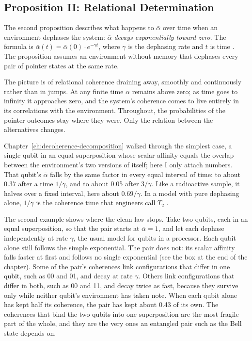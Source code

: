 \subsection*{Proposition II: Relational Determination}

The second proposition describes what happens to $\bar{\alpha}$ over time when an environment dephases the system: \emph{$\bar{\alpha}$ decays exponentially toward zero}. The formula is $\bar{\alpha}(t) = \bar{\alpha}(0) \cdot e^{-\gamma t}$, where $\gamma$ is the dephasing rate and $t$ is time \citep{AdamsRCT}. The proposition assumes an environment without memory that dephases every pair of pointer states at the same rate.

The picture is of relational coherence draining away, smoothly and continuously rather than in jumps. At any finite time $\bar{\alpha}$ remains above zero; as time goes to infinity it approaches zero, and the system's coherence comes to live entirely in its correlations with the environment. Throughout, the probabilities of the pointer outcomes stay where they were. Only the relation between the alternatives changes.

Chapter~\ref{ch:decoherence-decomposition} walked through the simplest case, a single qubit in an equal superposition whose scalar affinity equals the overlap between the environment's two versions of itself; here I only attach numbers. That qubit's $\bar{\alpha}$ falls by the same factor in every equal interval of time: to about 0.37 after a time $1/\gamma$, and to about 0.05 after $3/\gamma$. Like a radioactive sample, it halves over a fixed interval, here about $0.69/\gamma$. In a model with pure dephasing alone, $1/\gamma$ is the coherence time that engineers call $T_2$ \citep{Krantz2019}.

The second example shows where the clean law stops. Take two qubits, each in an equal superposition, so that the pair starts at $\bar{\alpha} = 1$, and let each dephase independently at rate $\gamma$, the usual model for qubits in a processor. Each qubit alone still follows the simple exponential. The pair does not: its scalar affinity falls faster at first and follows no single exponential (see the box at the end of the chapter). Some of the pair's coherences link configurations that differ in one qubit, such as 00 and 01, and decay at rate $\gamma$. Others link configurations that differ in both, such as 00 and 11, and decay twice as fast, because they survive only while neither qubit's environment has taken note. When each qubit alone has kept half its coherence, the pair has kept about 0.43 of its own. The coherences that bind the two qubits into one superposition are the most fragile part of the whole, and they are the very ones an entangled pair such as the Bell state depends on.

